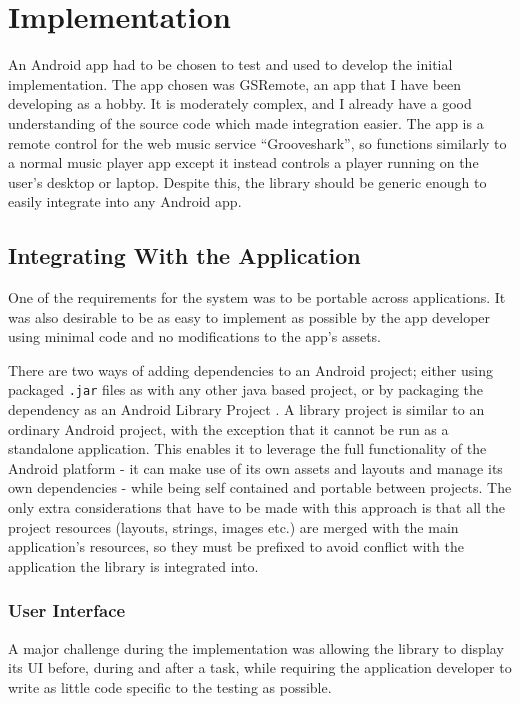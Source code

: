 \chapter{Implementation}

An Android app had to be chosen to test and used to develop the initial
implementation. The app chosen was GSRemote, an app that I have
been developing as a hobby. It is moderately complex, and I already
have a good understanding of the source code which made integration easier.
The app is a remote control for the web music service ``Grooveshark'',
so functions similarly to a normal music player app except it instead controls
a player running on the user's desktop or laptop.
Despite this, the library should be generic enough to easily integrate 
into any Android app.

\section{Integrating With the Application}

One of the requirements for the system was to be portable across
applications. It was also desirable to be as easy to implement
as possible by the app developer using minimal code and no
modifications to the app's assets.

There are two ways of adding dependencies to an Android project;
either using packaged \verb/.jar/ files as with any other java based
project, or by packaging the dependency as an Android Library
Project \cite{android-library}. A library project is similar to
an ordinary Android project, with the exception that it cannot
be run as a standalone application. This enables it to leverage
the full functionality of the Android
platform - it can make use of its own assets and layouts and manage
its own dependencies - while being self contained and portable
between projects. The only extra considerations that have to be
made with this approach is that all the project resources
(layouts, strings, images etc.) are merged with the main application's
resources, so they must be prefixed to avoid conflict with
the application the library is integrated into.

\subsection{User Interface}

A major challenge during the implementation was allowing the library
to display its UI before, during and after a task, while requiring
the application developer to write as little code specific to the
testing as possible.

